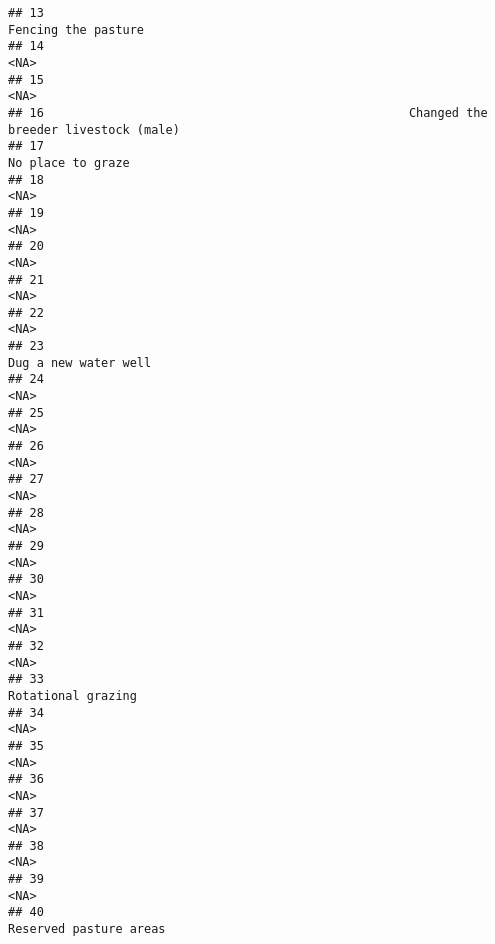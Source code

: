 \documentclass[
]{article}
\begin{document}
\begin{verbatim}
## 13                                                                    Fencing the pasture
## 14                                                                                   <NA>
## 15                                                                                   <NA>
## 16                                                   Changed the breeder livestock (male)
## 17                                                                      No place to graze
## 18                                                                                   <NA>
## 19                                                                                   <NA>
## 20                                                                                   <NA>
## 21                                                                                   <NA>
## 22                                                                                   <NA>
## 23                                                                   Dug a new water well
## 24                                                                                   <NA>
## 25                                                                                   <NA>
## 26                                                                                   <NA>
## 27                                                                                   <NA>
## 28                                                                                   <NA>
## 29                                                                                   <NA>
## 30                                                                                   <NA>
## 31                                                                                   <NA>
## 32                                                                                   <NA>
## 33                                                                     Rotational grazing
## 34                                                                                   <NA>
## 35                                                                                   <NA>
## 36                                                                                   <NA>
## 37                                                                                   <NA>
## 38                                                                                   <NA>
## 39                                                                                   <NA>
## 40                                                                 Reserved pasture areas

\end{verbatim}
\end{document}
